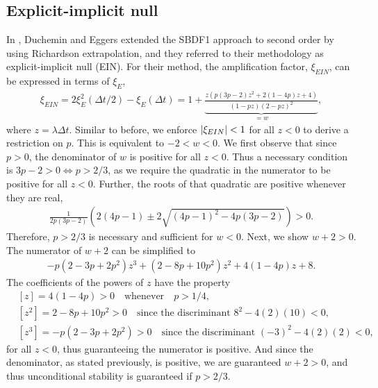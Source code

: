 \subsection{Explicit-implicit null}
\label{sect:ein}
In \cite{duchemin2014explicit}, Duchemin and Eggers extended the SBDF1 approach to second order by using Richardson extrapolation, and they referred to their methodology as explicit-implicit null (EIN). For their method, the amplification factor, $\xi_{EIN}$, can be expressed in terms of $\xi_E$, 
\begin{align}
\xi_{EIN} 
= 2\xi^2_{E}(\Delta t/2) - \xi_E(\Delta t) 
= 1 + \underbrace{\frac{z\left(p(3p-2)z^2 + 2(1-4p)z + 4 \right)}{(1 - pz)(2-pz)^2}}_{=w},
\end{align} 
where $z = \lambda\Delta t$. Similar to before, we enforce $\left|\xi_{EIN}\right|<1$ for all $z<0$ to derive a restriction on $p$. This is equivalent to $-2 < w < 0$. We first observe that since $p>0$, the denominator of $w$ is positive for all $z<0$. Thus a necessary condition is $3p-2 > 0 \iff p>2/3$, as we require the quadratic in the numerator to be positive for all $z<0$. Further, the roots of that quadratic are positive whenever they are real,
\begin{align}
\frac{1}{2p(3p-2)}\left(2(4p-1) \pm  2\sqrt{(4p-1)^2 - 4p(3p-2)}\right) > 0.
\end{align} 
Therefore, $p>2/3$ is necessary and sufficient for $w<0$. Next, we show $w+2>0$. The numerator of $w+2$ can be simplified to 
\begin{align}
-p(2-3p+2p^2) z^3 + (2-8p+10p^2)z^2 + 4(1-4p)z + 8.
\end{align}
The coefficients of the powers of $z$ have the property
\begin{align*}
& [z] = 4(1-4p) > 0 \quad\text{whenever}\quad p > 1/4,
\\
&[z^2] = 2-8p + 10p^2 > 0 \quad\text{since the discriminant } 8^2 - 4(2)(10) < 0,
\\
&[z^3] = -p(2-3p+2p^2) > 0 \quad\text{since the discriminant } (-3)^2 - 4(2)(2) < 0,
\end{align*}
for all $z<0$, thus guaranteeing the numerator is positive. And since the denominator, as stated previously, is positive, we are guaranteed $w+2>0$, and thus unconditional stability is guaranteed if $p>2/3$.

